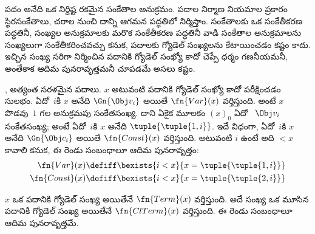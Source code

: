 \documentclass[../../../include/open-logic-section]{subfiles}
\begin{document}

\begin{explain}
పదం అనేది ఒక నిర్దిష్ట రకమైన సంకేతాల అనుక్రమం. పదాల నిర్మాణ నియమాల ప్రకారం
స్థిరసంకేతాలు, చరాల నుంచి
దాన్ని ఆగమన పద్ధతిలో నిర్మిస్తాం. సంకేతాలకు ఒక సంకేతీకరణ పద్ధతినీ,
సంఖ్యల అనుక్రమాలకు మరొక సంకేతీకరణ పద్ధతినీ వాడి సంకేతాల అనుక్రమాలను సంఖ్యలుగా
సంకేతీకరించవచ్చు కనుక, పదాలకు గ్యోడెల్ సంఖ్యలను కేటాయించడం కష్టం కాదు.
ఇచ్చిన సంఖ్య సరిగా నిర్మించిన పదానికి గ్యోడెల్ సంఖ్యో కాదో చెప్పే ధర్మం
గణనీయమనీ, అంతేకాక ఆదిమ పునరావృత్తమనీ చూపడమే అసలు కష్టం.
\end{explain}

, 
అత్యంత సరళమైన పదాలు. $x$ అటువంటి పదానికి గ్యోడెల్ సంఖ్యో కాదో పరీక్షించడం
సులభం. ఏదో~$i$కి $x$ అనేది $\Gn{\Obj v_i}$ అయితే $\fn{Var}(x)$ వర్తిస్తుంది.
అంటే $x$ పొడవు~$1$ గల అనుక్రమపు సంకేతసంఖ్య. దాని ఏకైక మూలకం $(x)_0$ ఏదో
~$\Obj v_i$ సంకేతసంఖ్య; అంటే ఏదో~$i$కి
$x$ అనేది $\tuple{\tuple{1,i}}$. ఇదే విధంగా, ఏదో~$i$కి $x$ అనేది $\Gn{\Obj c_i}$
అయితే $\fn{Const}(x)$ వర్తిస్తుంది. అటువంటి $i$ ఉంటే అది $<x$ కావాలి కనుక,
ఈ రెండు సంబంధాలూ ఆదిమ పునరావృత్తం:
\begin{align*}
  \fn{Var}(x) & \defiff \bexists{i<x}{x = \tuple{\tuple{1, i}}}\\
  \fn{Const}(x) & \defiff \bexists{i<x}{x = \tuple{\tuple{2, i}}}
\end{align*}

\begin{prop}
$x$ ఒక పదానికి గ్యోడెల్ సంఖ్య అయితేనే $\fn{Term}(x)$ వర్తిస్తుంది. అదే సంఖ్య ఒక మూసిన
పదానికి గ్యోడెల్ సంఖ్య అయితేనే $\fn{ClTerm}(x)$ వర్తిస్తుంది. ఈ రెండు సంబంధాలూ
ఆదిమ పునరావృత్తమే.
\end{prop}
\end{document}
